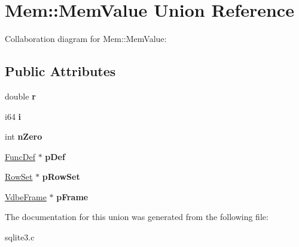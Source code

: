 \hypertarget{unionMem_1_1MemValue}{}\section{Mem\+:\+:Mem\+Value Union Reference}
\label{unionMem_1_1MemValue}


Collaboration diagram for Mem\+:\+:Mem\+Value\+:
\subsection*{Public Attributes}
\begin{DoxyCompactItemize}
\item 
double {\bfseries r}\hypertarget{unionMem_1_1MemValue_a1b30b01a5b7a3b337eeec4f39fb2a60c}{}\label{unionMem_1_1MemValue_a1b30b01a5b7a3b337eeec4f39fb2a60c}

\item 
i64 {\bfseries i}\hypertarget{unionMem_1_1MemValue_ac783c60cc4b1c0893931c997aa04ded6}{}\label{unionMem_1_1MemValue_ac783c60cc4b1c0893931c997aa04ded6}

\item 
int {\bfseries n\+Zero}\hypertarget{unionMem_1_1MemValue_a23976c454e79a60ca692305825792ca8}{}\label{unionMem_1_1MemValue_a23976c454e79a60ca692305825792ca8}

\item 
\hyperlink{structFuncDef}{Func\+Def} $\ast$ {\bfseries p\+Def}\hypertarget{unionMem_1_1MemValue_ad91c4fa3bebcc8bd9efa862841fd928d}{}\label{unionMem_1_1MemValue_ad91c4fa3bebcc8bd9efa862841fd928d}

\item 
\hyperlink{structRowSet}{Row\+Set} $\ast$ {\bfseries p\+Row\+Set}\hypertarget{unionMem_1_1MemValue_ab8b5abb605d926c611818285ecb3f7c5}{}\label{unionMem_1_1MemValue_ab8b5abb605d926c611818285ecb3f7c5}

\item 
\hyperlink{structVdbeFrame}{Vdbe\+Frame} $\ast$ {\bfseries p\+Frame}\hypertarget{unionMem_1_1MemValue_aa86f6085bfafd8a9ab3f41ac553f49fa}{}\label{unionMem_1_1MemValue_aa86f6085bfafd8a9ab3f41ac553f49fa}

\end{DoxyCompactItemize}


The documentation for this union was generated from the following file\+:\begin{DoxyCompactItemize}
\item 
sqlite3.\+c\end{DoxyCompactItemize}
